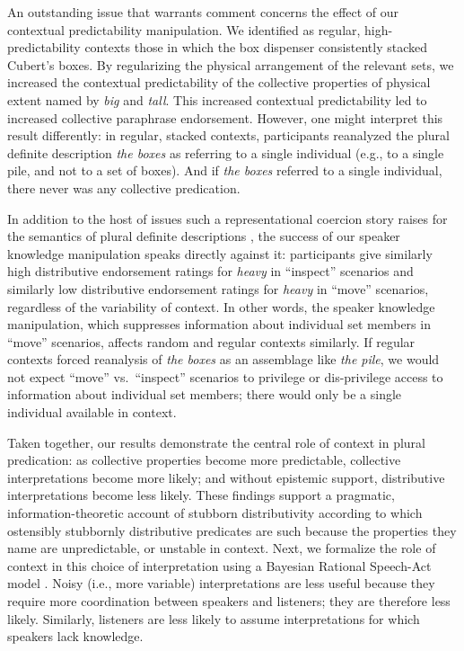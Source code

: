\documentclass[linguex]{sp}
\begin{document}
An outstanding issue that warrants comment concerns the effect of our contextual predictability manipulation. We identified as regular, high-predictability contexts those in which the box dispenser consistently stacked Cubert's boxes. By regularizing the physical arrangement of the relevant sets, we increased the contextual predictability of the collective properties of physical extent named by \emph{big} and \emph{tall}. This increased contextual predictability led to increased collective paraphrase endorsement. However, one might interpret this result differently: in regular, stacked contexts, participants reanalyzed the plural definite description \emph{the boxes} as referring to a single individual (e.g., to a single pile, and not to a set of boxes). And if \emph{the boxes} referred to a single individual, there never was any collective predication.

In addition to the host of issues such a representational coercion story raises for the semantics of plural definite descriptions \citep[for discussion, see ][]{link1983,landman1989,schwarzschild1996,link1998}, the success of our speaker knowledge manipulation speaks directly against it: participants give similarly high distributive endorsement ratings for \emph{heavy} in ``inspect'' scenarios and similarly low distributive endorsement ratings for \emph{heavy} in ``move'' scenarios, regardless of the variability of context. In other words, the speaker knowledge manipulation, which suppresses information about individual set members in ``move'' scenarios, affects random and regular contexts similarly. If regular contexts forced reanalysis of \emph{the boxes} as an assemblage like \emph{the pile}, we would not expect ``move'' vs.~``inspect'' scenarios to privilege or dis-privilege access to information about individual set members; there would only be a single individual available in context.

Taken together, our results demonstrate the central role of context in plural predication: as collective properties become more predictable, collective interpretations become more likely; and without epistemic support, distributive interpretations become less likely. These findings support a pragmatic, information-theoretic account of stubborn distributivity according to which ostensibly stubbornly distributive predicates are such because the properties they name are unpredictable, or unstable in context. Next, we formalize the role of context in this choice of interpretation using a Bayesian Rational Speech-Act model \citep{frankgoodman2012,lassitergoodman2013}. Noisy (i.e., more variable) interpretations are less useful because they require more coordination between speakers and listeners; they are therefore less likely. Similarly, listeners are less likely to assume interpretations for which speakers lack knowledge.
\end{document}
